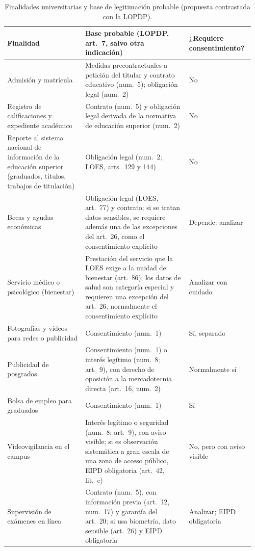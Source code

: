 \begin{table}[htbp]
\centering
\caption{Finalidades universitarias y base de legitimación probable (propuesta contrastada con la LOPDP).}
\label{tab:finalidad_base}
\scriptsize
\renewcommand{\arraystretch}{1.15}
\begin{tabularx}{\textwidth}{|>{\raggedright\arraybackslash}p{3.0cm}|L|>{\raggedright\arraybackslash}p{2.8cm}|}
  \hline
  \textbf{Finalidad} & \textbf{Base probable (LOPDP, art.~7, salvo otra indicación)} & \textbf{¿Requiere consentimiento?} \\
  \hline
  Admisión y matrícula & Medidas precontractuales a petición del titular y contrato educativo (num.~5); obligación legal (num.~2) & No \\ \hline
  Registro de calificaciones y expediente académico & Contrato (num.~5) y obligación legal derivada de la normativa de educación superior (num.~2) & No \\ \hline
  Reporte al sistema nacional de información de la educación superior (graduados, títulos, trabajos de titulación) & Obligación legal (num.~2; LOES, arts.~129 y 144) & No \\ \hline
  Becas y ayudas económicas & Obligación legal (LOES, art.~77) y contrato; si se tratan datos sensibles, se requiere además una de las excepciones del art.~26, como el consentimiento explícito & Depende: analizar \\ \hline
  Servicio médico o psicológico (bienestar) & Prestación del servicio que la LOES exige a la unidad de bienestar (art.~86); los datos de salud son categoría especial y requieren una excepción del art.~26, normalmente el consentimiento explícito & Analizar con cuidado \\ \hline
  Fotografías y videos para redes o publicidad & Consentimiento (num.~1) & Sí, separado \\ \hline
  Publicidad de posgrados & Consentimiento (num.~1) o interés legítimo (num.~8; art.~9), con derecho de oposición a la mercadotecnia directa (art.~16, num.~2) & Normalmente sí \\ \hline
  Bolsa de empleo para graduados & Consentimiento (num.~1) & Sí \\ \hline
  Videovigilancia en el campus & Interés legítimo o seguridad (num.~8; art.~9), con aviso visible; si es observación sistemática a gran escala de una zona de acceso público, EIPD obligatoria (art.~42, lit.~c) & No, pero con aviso visible \\ \hline
  Supervisión de exámenes en línea & Contrato (num.~5), con información previa (art.~12, num.~17) y garantía del art.~20; si usa biometría, dato sensible (art.~26) y EIPD obligatoria & Analizar; EIPD obligatoria \\ \hline
\end{tabularx}
\raggedright
{}
\end{table}

